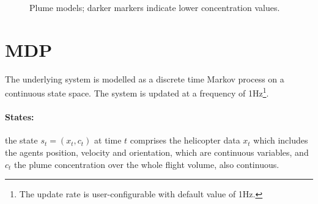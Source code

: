 \documentclass[a4paper,11pt]{report}
\begin{document}
\begin{figure}[ht]
\centering
{}
\caption{Plume models; darker markers indicate lower concentration values.\label{fig:plume}}
\end{figure}

\section{MDP}
The underlying system is modelled as a discrete time Markov process on a continuous state space. The system is updated at a frequency of 1Hz\footnote{The update rate is user-configurable with default value of 1Hz.}. 

\paragraph{States:} the state $s_t=(x_t,c_t)$ at time $t$ comprises the helicopter data $x_t$ which includes the agents position, velocity and orientation, which are continuous variables, and $c_t$ the plume concentration over the whole flight volume, also continuous.
\end{document}
